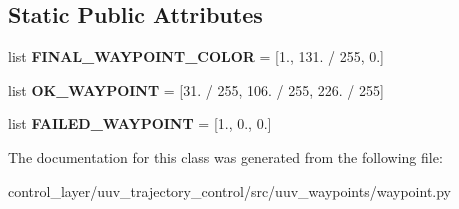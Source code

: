 \subsection*{Static Public Attributes}
\begin{DoxyCompactItemize}
\item 
\mbox{\label{classuuv__waypoints_1_1waypoint_1_1Waypoint_aaadafb31565e1efb7f6dc2d449ec9120}} 
list {\bfseries F\+I\+N\+A\+L\+\_\+\+W\+A\+Y\+P\+O\+I\+N\+T\+\_\+\+C\+O\+L\+OR} = \mbox{[}1., 131. / 255, 0.\mbox{]}
\item 
\mbox{\label{classuuv__waypoints_1_1waypoint_1_1Waypoint_aeb34be1beaef48d5e1fdef067d39c102}} 
list {\bfseries O\+K\+\_\+\+W\+A\+Y\+P\+O\+I\+NT} = \mbox{[}31. / 255, 106. / 255, 226. / 255\mbox{]}
\item 
\mbox{\label{classuuv__waypoints_1_1waypoint_1_1Waypoint_a0eb11d0f519d635450a939b867677c89}} 
list {\bfseries F\+A\+I\+L\+E\+D\+\_\+\+W\+A\+Y\+P\+O\+I\+NT} = \mbox{[}1., 0., 0.\mbox{]}
\end{DoxyCompactItemize}


The documentation for this class was generated from the following file\+:\begin{DoxyCompactItemize}
\item 
control\+\_\+layer/uuv\+\_\+trajectory\+\_\+control/src/uuv\+\_\+waypoints/waypoint.\+py\end{DoxyCompactItemize}
